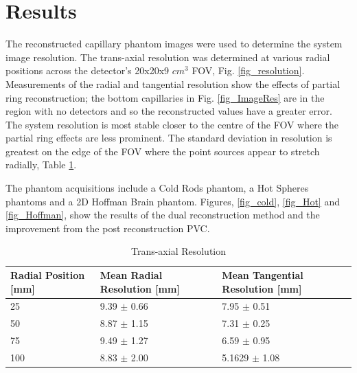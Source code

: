 \section{Results}
 The reconstructed capillary phantom images were used to determine the system image resolution. The trans-axial resolution was determined at various radial positions across the detector's 20x20x9 $cm^3$ FOV, Fig. \ref{fig_resolution}. Measurements of the radial and tangential resolution show the effects of partial ring reconstruction; the bottom capillaries in Fig. \ref{fig_ImageRes} are in the region with no detectors and so the reconstructed values have a greater error. The system resolution is most stable closer to the centre of the FOV where the partial ring effects are less prominent. The standard deviation in resolution is greatest on the edge of the FOV where the point sources appear to stretch radially, Table \ref{table_reso}.
 
 The phantom acquisitions include a Cold Rods phantom, a Hot Spheres phantoms and a 2D Hoffman Brain phantom. Figures, \ref{fig_cold}, \ref{fig_Hot} and \ref{fig_Hoffman}, show the results of the dual reconstruction method and the improvement from the post reconstruction PVC. 



\begin{table}[!b]
\renewcommand{\arraystretch}{1.3}

\captionsetup{font=small}
\caption{Trans-axial Resolution}
\label{table_reso}
\centering

\begin{tabular}{|p{2.5cm}|p{2.8cm}|p{2.8cm}|}
\hline
Radial Position [mm]& Mean Radial Resolution [mm]& Mean Tangential Resolution [mm] \\
\hline
 25 & 9.39 $\pm$ 0.66 & 7.95 $\pm$ 0.51\\
\hline
 50 & 8.87 $\pm$ 1.15 & 7.31 $\pm$ 0.25\\
\hline
 75 & 9.49 $\pm$ 1.27 & 6.59 $\pm$ 0.95\\
\hline
 100 & 8.83 $\pm$ 2.00 & 5.1629 $\pm$ 1.08\\
\hline
\end{tabular}
\end{table}




